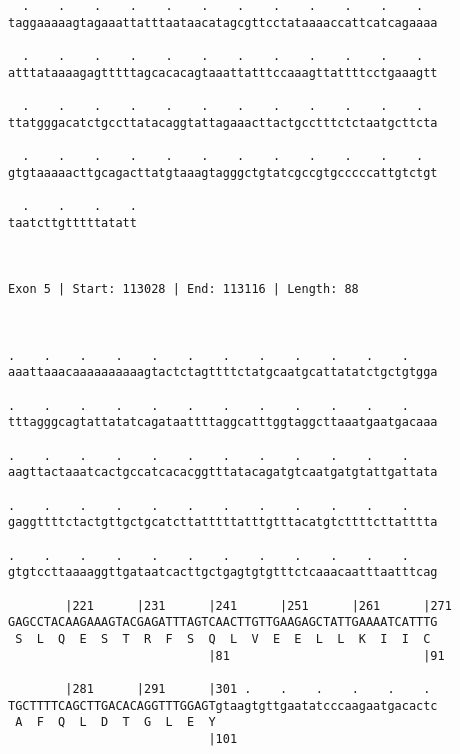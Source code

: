 \documentclass{article}
\begin{document}
\begin{Verbatim}
  .    .    .    .    .    .    .    .    .    .    .    .  
taggaaaaagtagaaattatttaataacatagcgttcctataaaaccattcatcagaaaa
                                                            
  .    .    .    .    .    .    .    .    .    .    .    .  
atttataaaagagtttttagcacacagtaaattatttccaaagttattttcctgaaagtt
                                                            
  .    .    .    .    .    .    .    .    .    .    .    .  
ttatgggacatctgccttatacaggtattagaaacttactgcctttctctaatgcttcta
                                                            
  .    .    .    .    .    .    .    .    .    .    .    .  
gtgtaaaaacttgcagacttatgtaaagtagggctgtatcgccgtgcccccattgtctgt
                                                            
  .    .    .    .
taatcttgtttttatatt
                  
                  
 
Exon 5 | Start: 113028 | End: 113116 | Length: 88



.    .    .    .    .    .    .    .    .    .    .    .    
aaattaaacaaaaaaaaaagtactctagttttctatgcaatgcattatatctgctgtgga
                                                            
.    .    .    .    .    .    .    .    .    .    .    .    
tttagggcagtattatatcagataattttaggcatttggtaggcttaaatgaatgacaaa
                                                            
.    .    .    .    .    .    .    .    .    .    .    .    
aagttactaaatcactgccatcacacggtttatacagatgtcaatgatgtattgattata
                                                            
.    .    .    .    .    .    .    .    .    .    .    .    
gaggttttctactgttgctgcatcttatttttatttgtttacatgtcttttcttatttta
                                                            
.    .    .    .    .    .    .    .    .    .    .    .    
gtgtccttaaaaggttgataatcacttgctgagtgtgtttctcaaacaatttaatttcag
                                                            
        |221      |231      |241      |251      |261      |271
GAGCCTACAAGAAAGTACGAGATTTAGTCAACTTGTTGAAGAGCTATTGAAAATCATTTG
 S  L  Q  E  S  T  R  F  S  Q  L  V  E  E  L  L  K  I  I  C 
                            |81                           |91
  
        |281      |291      |301 .    .    .    .    .    . 
TGCTTTTCAGCTTGACACAGGTTTGGAGTgtaagtgttgaatatcccaagaatgacactc
 A  F  Q  L  D  T  G  L  E  Y                               
                            |101                            
  

\end{Verbatim}
\end{document}
